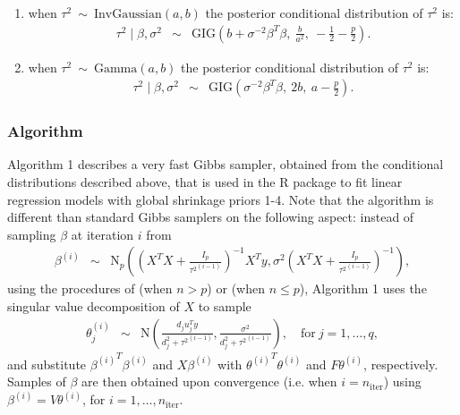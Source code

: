 \documentclass[nojss]{jss}
\begin{document}
\begin{enumerate}
	\item when $\tau^2 \ \sim\  \mathrm{InvGaussian}(a, b)$ the posterior conditional distribution of $\tau^{2}$ is:
    \begin{eqnarray*}
      \tau^2\mid \beta, \sigma^2 &\sim& \mathrm{GIG}\left( b + \sigma^{-2} \beta^T \beta,\ \frac{b}{a^2},\ -\frac{1}{2}-\frac{p}{2} \right).
    \end{eqnarray*}
	\item when $\tau^2 \ \sim\  \mathrm{Gamma}(a, b)$ the posterior conditional distribution of $\tau^{2}$ is:
    \begin{eqnarray*}
      \tau^2\mid \beta, \sigma^2 &\sim& \mathrm{GIG}\left( \sigma^{-2} \beta^T \beta,\ 2b ,\ a-\frac{p}{2} \right).
    \end{eqnarray*}
\end{enumerate}

\subsubsection{Algorithm}

Algorithm 1 describes a very fast Gibbs sampler, obtained from the conditional
distributions described above, that is used in the R package  to
fit linear regression models with global shrinkage priors 1-4.
Note that the algorithm is different than standard Gibbs samplers on the
following aspect: instead of sampling $\beta$ at iteration $i$ from
\begin{eqnarray*}
\beta^{(i)} &\sim& \mathrm{N}_p\left( \left( X^T X + \frac{ I_p}{{\tau^2}^{(i-1)} } \right)^{-1} X^T y, \sigma^2 \left( X^T X + \frac{ I_p}{{\tau^2}^{(i-1)} }\right)^{-1} \right),
\end{eqnarray*}
using the procedures of \citet{rue2001} (when $n>p$) or \citet{bhattacharya2016} (when $n\leq p$), Algorithm 1 uses the singular value decomposition of $X$ to sample
\begin{eqnarray*}
\theta_j^{(i)} &\sim& \mathrm{N}\left( \frac{ d_j u_j^T y }{d_j^2 + {\tau^2}^{(i-1)} },  \frac{ \sigma^2 }{d_j^2 + {\tau^2}^{(i-1)} } \right), \quad \mathrm{for}\ j=1, \ldots, q,
\end{eqnarray*}
and substitute ${\beta^{(i)}}^T \beta^{(i)}$ and $X\beta^{(i)}$ with ${\theta^{(i)}}^T \theta^{(i)}$ and $F\theta^{(i)}$, respectively. Samples of $\beta$ are then obtained upon convergence (i.e. when $i=n_{\mathrm{iter}}$) using $\beta^{(i)} = V \theta^{(i)}$, for $i=1, \ldots, n_{\mathrm{iter}}$.
\end{document}
